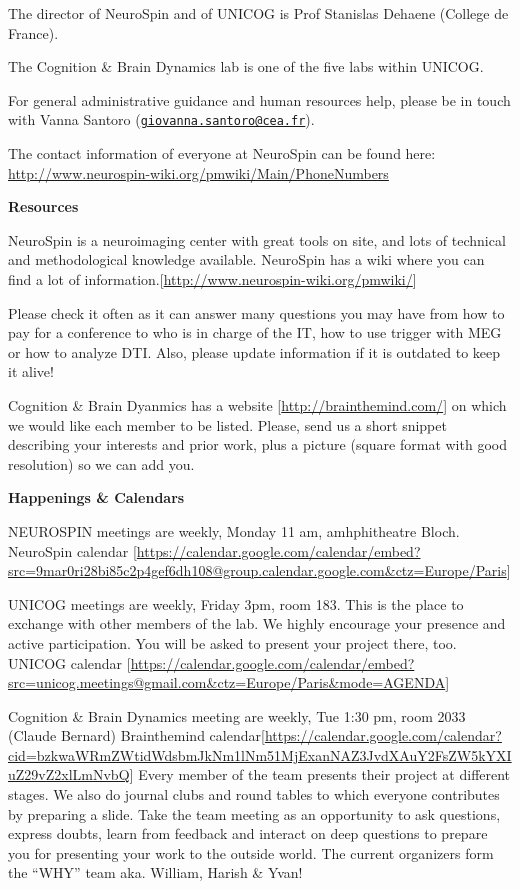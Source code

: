 \documentclass[]{book}
\begin{document}
The director of NeuroSpin and of UNICOG is Prof Stanislas Dehaene (College de France).

The Cognition \& Brain Dynamics lab is one of the five labs within UNICOG.

For general administrative guidance and human resources help, please be in touch with Vanna Santoro (\href{mailto:giovanna.santoro@cea.fr}{\nolinkurl{giovanna.santoro@cea.fr}}).

The contact information of everyone at NeuroSpin can be found here: \url{http://www.neurospin-wiki.org/pmwiki/Main/PhoneNumbers}

\textbf{Resources}

NeuroSpin is a neuroimaging center with great tools on site, and lots of technical and methodological knowledge available. NeuroSpin has a wiki where you can find a lot of information.{[}\url{http://www.neurospin-wiki.org/pmwiki/}{]}

Please check it often as it can answer many questions you may have from how to pay for a conference to who is in charge of the IT, how to use trigger with MEG or how to analyze DTI. Also, please update information if it is outdated to keep it alive!

Cognition \& Brain Dyanmics has a website {[}\url{http://brainthemind.com/}{]} on which we would like each member to be listed. Please, send us a short snippet describing your interests and prior work, plus a picture (square format with good resolution) so we can add you.

\textbf{Happenings \& Calendars}

NEUROSPIN meetings are weekly, Monday 11 am, amhphitheatre Bloch.
NeuroSpin calendar {[}\url{https://calendar.google.com/calendar/embed?src=9mar0ri28bi85c2p4gef6dh108@group.calendar.google.com\&ctz=Europe/Paris}{]}

UNICOG meetings are weekly, Friday 3pm, room 183. This is the place to exchange with other members of the lab. We highly encourage your presence and active participation. You will be asked to present your project there, too.
UNICOG calendar {[}\url{https://calendar.google.com/calendar/embed?src=unicog.meetings@gmail.com\&ctz=Europe/Paris\&mode=AGENDA}{]}

Cognition \& Brain Dynamics meeting are weekly, Tue 1:30 pm, room 2033 (Claude Bernard)
Brainthemind calendar{[}\url{https://calendar.google.com/calendar?cid=bzkwaWRmZWtidWdsbmJkNm1lNm51MjExanNAZ3JvdXAuY2FsZW5kYXIuZ29vZ2xlLmNvbQ}{]}
Every member of the team presents their project at different stages. We also do journal clubs and round tables to which everyone contributes by preparing a slide. Take the team meeting as an opportunity to ask questions, express doubts, learn from feedback and interact on deep questions to prepare you for presenting your work to the outside world.
The current organizers form the ``WHY'' team aka. William, Harish \& Yvan!
\end{document}

